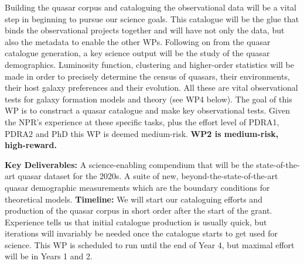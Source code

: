 \smallskip
\smallskip
\noindent
Building the quasar corpus and cataloguing the observational data will
be a vital step in beginning to pursue our science goals. This
catalogue will be the glue that binds the observational projects
together and will have not only the data, but also the metadata to
enable the other WPs.  Following on from the quasar catalogue
generation, a key science output will be the study of the quasar
demographics.  Luminosity function, clustering and higher-order
statistics will be made in order to precisely determine the census of
quasars, their environments, their host galaxy preferences and their
evolution. All these are vital observational tests for galaxy
formation models and theory (see WP4 below). The goal of this WP is to
construct a quasar catalogue and make key observational tests.
Given the NPR's experience at these specific tasks, plus the effort
level of PDRA1, PDRA2 and PhD this WP is deemed medium-risk.
{\bf WP2 is medium-risk, high-reward.}  

\smallskip
\smallskip
\noindent
{\bf Key Deliverables:} A science-enabling compendium that will be the
state-of-the-art quasar dataset for the 2020s.  A suite of new,
beyond-the-state-of-the-art quasar demographic measurements which are
the boundary conditions for theoretical models. {\bf Timeline:} We
will start our cataloguing efforts and production of the quasar corpus
in short order after the start of the grant.  Experience tells us that
initial catalogue production is usually quick, but iterations will
invariably be needed once the catalogue starts to get used for
science. This WP is scheduled to run until the end of Year 4, but
maximal effort will be in Years 1 and 2.


